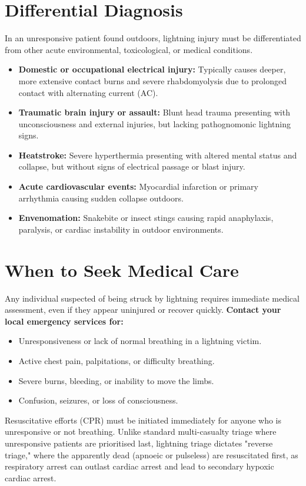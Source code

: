 \section*{Differential Diagnosis}
In an unresponsive patient found outdoors, lightning injury must be differentiated from other acute environmental, toxicological, or medical conditions.
\begin{itemize}
    \item \textbf{Domestic or occupational electrical injury:} Typically causes deeper, more extensive contact burns and severe rhabdomyolysis due to prolonged contact with alternating current (AC).
    \item \textbf{Traumatic brain injury or assault:} Blunt head trauma presenting with unconsciousness and external injuries, but lacking pathognomonic lightning signs.
    \item \textbf{Heatstroke:} Severe hyperthermia presenting with altered mental status and collapse, but without signs of electrical passage or blast injury.
    \item \textbf{Acute cardiovascular events:} Myocardial infarction or primary arrhythmia causing sudden collapse outdoors.
    \item \textbf{Envenomation:} Snakebite or insect stings causing rapid anaphylaxis, paralysis, or cardiac instability in outdoor environments.
\end{itemize}

\section*{When to Seek Medical Care}
Any individual suspected of being struck by lightning requires immediate medical assessment, even if they appear uninjured or recover quickly.
\textbf{Contact your local emergency services for:}
\begin{itemize}
    \item Unresponsiveness or lack of normal breathing in a lightning victim.
    \item Active chest pain, palpitations, or difficulty breathing.
    \item Severe burns, bleeding, or inability to move the limbs.
    \item Confusion, seizures, or loss of consciousness.
\end{itemize}
Resuscitative efforts (CPR) must be initiated immediately for anyone who is unresponsive or not breathing. Unlike standard multi-casualty triage where unresponsive patients are prioritised last, lightning triage dictates "reverse triage," where the apparently dead (apnoeic or pulseless) are resuscitated first, as respiratory arrest can outlast cardiac arrest and lead to secondary hypoxic cardiac arrest.


